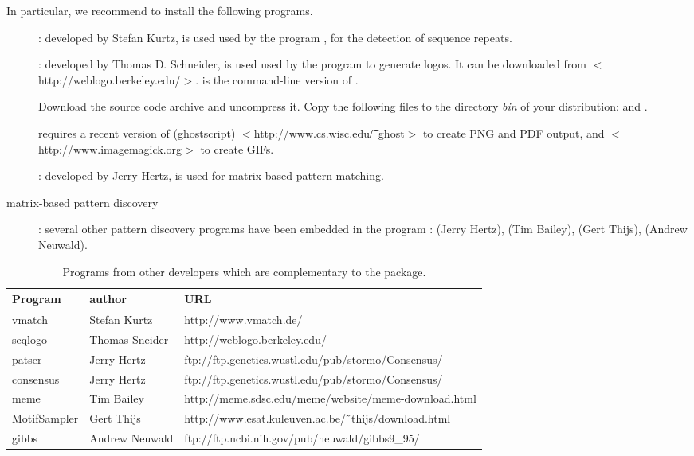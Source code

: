 \documentclass{book}
\begin{document}
In particular, we recommend to install the following programs.

\begin{description}
\item[]: developed by Stefan Kurtz, is used used by the
program , for the detection of sequence repeats.

\item[]:  developed by Thomas D. Schneider, is used
used by the program  to generate logos. It can
be downloaded from $<$http://weblogo.berkeley.edu/$>$.  is
the command-line version of .

Download the source code archive and uncompress it. Copy the following
 files to the directory \emph{bin} of your \RSAT distribution:
 and .

 requires a recent version of  (ghostscript)
$<$http://www.cs.wisc.edu/\t~ghost$>$ to create PNG and PDF output, and
 $<$http://www.imagemagick.org$>$ to create GIFs.

\item[]: developed by Jerry Hertz, is used for
  matrix-based pattern matching.

\item[matrix-based pattern discovery]: several other pattern discovery
  programs have been embedded in the \RSAT program
  :
 (Jerry Hertz),
 (Tim Bailey),
 (Gert Thijs),
 (Andrew Neuwald).


\end{description}


\begin{table}
\begin{center}
\begin{tabular}{lll}
\hline
Program & author  & URL \\
\hline
vmatch & Stefan Kurtz & http://www.vmatch.de/ \\
seqlogo & Thomas Sneider & http://weblogo.berkeley.edu/ \\
patser & Jerry Hertz & ftp://ftp.genetics.wustl.edu/pub/stormo/Consensus/ \\
consensus & Jerry Hertz &  ftp://ftp.genetics.wustl.edu/pub/stormo/Consensus/ \\
meme & Tim Bailey & http://meme.sdsc.edu/meme/website/meme-download.html \\
MotifSampler & Gert Thijs & http://www.esat.kuleuven.ac.be/$\tilde{\hspace{0.4em}}$thijs/download.html \\
gibbs & Andrew Neuwald & ftp://ftp.ncbi.nih.gov/pub/neuwald/gibbs9\_95/ \\
\hline
\end{tabular}
\end{center}
\caption{\label{table:other_programs} Programs from other developers
  which are complementary to the \RSAT package.}
\end{table}
\end{document}
